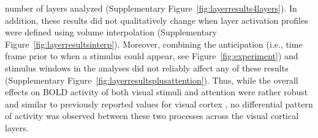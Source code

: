 number of layers analyzed (Supplementary Figure~\ref{fig:layerresults4layers}). In addition, these results did not qualitatively change when layer activation profiles were defined using volume interpolation (Supplementary Figure~\ref{fig:layerresultsinterp}). Moreover, combining the anticipation (i.e., time frame prior to when a stimulus could appear, see Figure~\ref{fig:experiment}) and stimulus windows in the analyses did not reliably affect any of these results (Supplementary Figure~\ref{fig:layerresultsplusattention}). Thus, while the overall effects on BOLD activity of both visual stimuli and attention were rather robust and similar to previously reported values for visual cortex \cite{Kastner1999,Jehee2011, Koopmans2010}, no differential pattern of activity was observed between these two processes across the visual cortical layers.





